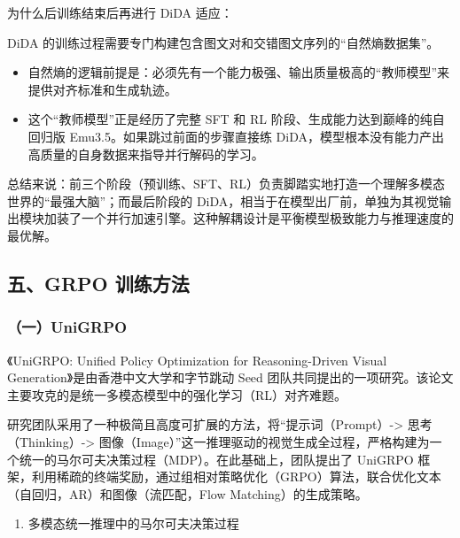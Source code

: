 为什么后训练结束后再进行 DiDA 适应：

DiDA 的训练过程需要专门构建包含图文对和交错图文序列的``自然熵数据集''。

\begin{itemize}
\tightlist
\item
  自然熵的逻辑前提是：必须先有一个能力极强、输出质量极高的``教师模型''来提供对齐标准和生成轨迹。
\item
  这个``教师模型''正是经历了完整 SFT 和 RL 阶段、生成能力达到巅峰的纯自回归版 Emu3.5。如果跳过前面的步骤直接练 DiDA，模型根本没有能力产出高质量的自身数据来指导并行解码的学习。
\end{itemize}

总结来说：前三个阶段（预训练、SFT、RL）负责脚踏实地打造一个理解多模态世界的``最强大脑''；而最后阶段的 DiDA，相当于在模型出厂前，单独为其视觉输出模块加装了一个并行加速引擎。这种解耦设计是平衡模型极致能力与推理速度的最优解。

\hypertarget{ux4e94grpo-ux8badux7ec3ux65b9ux6cd5}{%
\subsection{五、GRPO 训练方法}\label{ux4e94grpo-ux8badux7ec3ux65b9ux6cd5}}

\hypertarget{ux4e00unigrpo}{%
\subsubsection{（一）UniGRPO}\label{ux4e00unigrpo}}

《UniGRPO: Unified Policy Optimization for Reasoning-Driven Visual Generation》是由香港中文大学和字节跳动 Seed 团队共同提出的一项研究。该论文主要攻克的是统一多模态模型中的强化学习（RL）对齐难题。

研究团队采用了一种极简且高度可扩展的方法，将``提示词（Prompt）-\textgreater{} 思考（Thinking）-\textgreater{} 图像（Image）''这一推理驱动的视觉生成全过程，严格构建为一个统一的马尔可夫决策过程（MDP）。在此基础上，团队提出了 UniGRPO 框架，利用稀疏的终端奖励，通过组相对策略优化（GRPO）算法，联合优化文本（自回归，AR）和图像（流匹配，Flow Matching）的生成策略。

\begin{enumerate}
\def\labelenumi{\arabic{enumi}.}
\tightlist
\item
  多模态统一推理中的马尔可夫决策过程
\end{enumerate}

